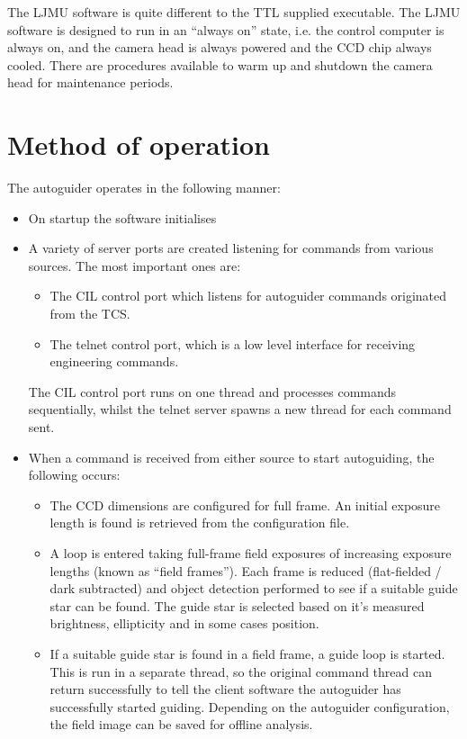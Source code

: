 \documentclass[10pt,a4paper]{article}
\begin{document}
The LJMU software is quite different to the TTL supplied executable. The LJMU software is designed to run in an ``always on'' state, i.e. the control computer is always on, and the camera head is always powered and the CCD chip always cooled. There are procedures available to warm up and shutdown the camera head for maintenance periods.

\section{Method of operation}

The autoguider operates in the following manner:

\begin{itemize}
\item On startup the software initialises
\item A variety of server ports are created listening for commands from various sources. The most important ones are:
      \begin{itemize}
      \item The CIL control port which listens for autoguider commands originated from the TCS. 
      \item The telnet control port, which is a low level interface for receiving engineering commands. 
      \end{itemize}
      The CIL control port runs on one thread and processes commands sequentially, whilst the telnet server spawns a new thread for each command sent.
\item When a command is received from either source to start autoguiding, the following occurs:
      \begin{itemize}
      \item The CCD dimensions are configured for full frame. An initial exposure length is found is retrieved from the configuration file.
      \item A loop is entered taking full-frame field exposures of increasing exposure lengths (known as ``field frames''). Each frame is reduced (flat-fielded / dark subtracted) and object detection performed to see if a suitable guide star can be found. The guide star is selected based on it's measured brightness, ellipticity and in some cases position.
      \item If a suitable guide star is found in a field frame, a guide loop is started. This is run in a separate thread, so the original command thread can return successfully to tell the client software the autoguider has successfully started guiding. Depending on the autoguider configuration, the field image can be saved for offline analysis.

\end{itemize}
\end{itemize}
\end{document}
